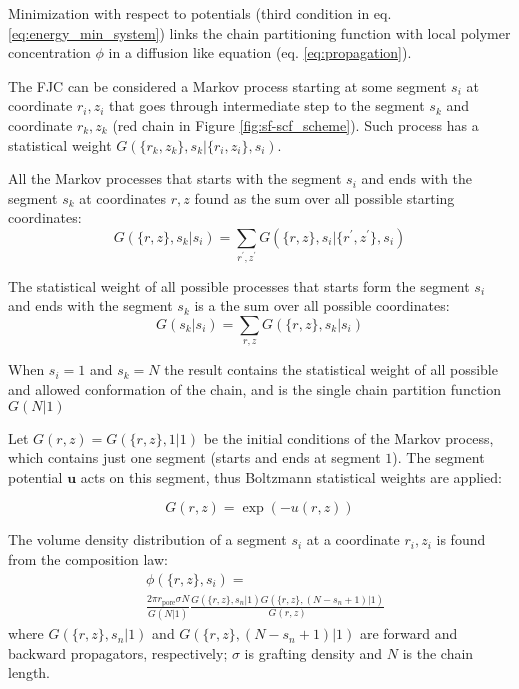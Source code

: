 \documentclass[10pt, a4paper]{article}
\begin{document}
\begin{multicols}{2}
Minimization with respect to potentials (third condition in eq.\ref{eq:energy_min_system}) links the chain partitioning function with local polymer concentration $\phi$ in a diffusion like equation (eq. \ref{eq:propagation}).

The FJC can be considered a Markov process starting at some segment $s_{i}$ at coordinate $r_{i}, z_{i}$ that goes through intermediate step to the segment $s_{k}$ and coordinate $r_{k}, z_{k}$ (red chain in Figure \ref{fig:sf-scf_scheme}).
Such process has a statistical weight $G(\{r_{k}, z_{k}\}, s_{k} | \{r_{i}, z_{i}\}, s_{i})$.

All the Markov processes that starts with the segment $s_{i}$ and ends with the segment $s_{k}$ at coordinates ${r, z}$ found as the sum over all possible starting coordinates:
\begin{equation}
    G(\{r, z\}, s_{k} | s_{i}) = \sum_{r^{\prime}, z^{\prime}} G(\{r, z\}, s_{i} | \{r^{\prime}, z^{\prime}\}, s_{i})
\end{equation}

The statistical weight of all possible processes that starts form the segment $s_{i}$ and ends with the segment $s_{k}$ is a the sum over all possible coordinates:
\begin{equation}
    G(s_{k} | s_{i}) = \sum_{r, z} G(\{r, z\}, s_{k} | s_{i})
\end{equation}

When $s_{i}=1$ and $s_{k}=N$ the result contains the statistical weight of all possible and allowed conformation of the chain, and is the single chain partition function $G(N|1)$

Let $G(r, z) = G(\{r, z\}, 1|1)$ be the initial conditions of the Markov process, which contains just one segment (starts and ends at segment $1$).
The segment potential $\mathbf{u}$ acts on this segment, thus Boltzmann statistical weights are applied:

\begin{equation}
    G(r, z) = \exp(-u(r,z))
\end{equation}

The volume density distribution of a segment $s_i$ at a coordinate $r_{i}, z_{i}$ is found from the composition law:
\begin{equation}
    \label{eq:propagation}
    \begin{aligned}
        &\phi(\{r, z\}, s_{i}) = \\
        &\frac{2 \pi r_{\textrm{pore}} \sigma N}{G(N|1)}
        \frac{G(\{r, z\}, s_n | 1) G(\{r, z\}, (N-s_n+1) | 1)}{G(r, z)}
    \end{aligned}
\end{equation}
where $G(\{r, z\}, s_n | 1)$ and $G(\{r, z\}, (N-s_n+1) | 1)$ are forward and backward propagators, respectively; $\sigma$ is grafting density and $N$ is the chain length.


\end{multicols}
\end{document}
